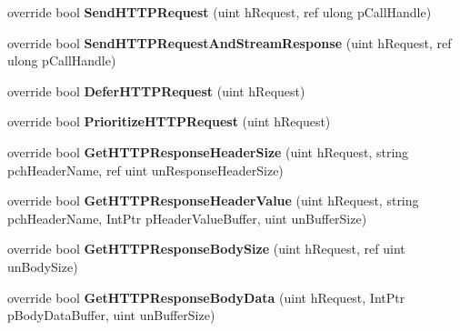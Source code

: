 \begin{DoxyCompactItemize}
\item 
\hypertarget{classValve_1_1Steamworks_1_1CSteamHTTP_a50e12fb3f3b912def8bb3e17db53b0eb}{}override bool {\bfseries Send\+H\+T\+T\+P\+Request} (uint h\+Request, ref ulong p\+Call\+Handle)\label{classValve_1_1Steamworks_1_1CSteamHTTP_a50e12fb3f3b912def8bb3e17db53b0eb}

\item 
\hypertarget{classValve_1_1Steamworks_1_1CSteamHTTP_a670a6ab2e70e5f2fa7882a75574e7c41}{}override bool {\bfseries Send\+H\+T\+T\+P\+Request\+And\+Stream\+Response} (uint h\+Request, ref ulong p\+Call\+Handle)\label{classValve_1_1Steamworks_1_1CSteamHTTP_a670a6ab2e70e5f2fa7882a75574e7c41}

\item 
\hypertarget{classValve_1_1Steamworks_1_1CSteamHTTP_a818b1c3bdb2c64bdfe1e1214a3d969ec}{}override bool {\bfseries Defer\+H\+T\+T\+P\+Request} (uint h\+Request)\label{classValve_1_1Steamworks_1_1CSteamHTTP_a818b1c3bdb2c64bdfe1e1214a3d969ec}

\item 
\hypertarget{classValve_1_1Steamworks_1_1CSteamHTTP_ae0bdad8b9352437449c41d03ff2c4b13}{}override bool {\bfseries Prioritize\+H\+T\+T\+P\+Request} (uint h\+Request)\label{classValve_1_1Steamworks_1_1CSteamHTTP_ae0bdad8b9352437449c41d03ff2c4b13}

\item 
\hypertarget{classValve_1_1Steamworks_1_1CSteamHTTP_a63ab09b6135fc2f93c75bac9447c73ee}{}override bool {\bfseries Get\+H\+T\+T\+P\+Response\+Header\+Size} (uint h\+Request, string pch\+Header\+Name, ref uint un\+Response\+Header\+Size)\label{classValve_1_1Steamworks_1_1CSteamHTTP_a63ab09b6135fc2f93c75bac9447c73ee}

\item 
\hypertarget{classValve_1_1Steamworks_1_1CSteamHTTP_ae9a11ddda840caf57d105582b2be51b8}{}override bool {\bfseries Get\+H\+T\+T\+P\+Response\+Header\+Value} (uint h\+Request, string pch\+Header\+Name, Int\+Ptr p\+Header\+Value\+Buffer, uint un\+Buffer\+Size)\label{classValve_1_1Steamworks_1_1CSteamHTTP_ae9a11ddda840caf57d105582b2be51b8}

\item 
\hypertarget{classValve_1_1Steamworks_1_1CSteamHTTP_a123672f994b6437b3e71a2e37640ba45}{}override bool {\bfseries Get\+H\+T\+T\+P\+Response\+Body\+Size} (uint h\+Request, ref uint un\+Body\+Size)\label{classValve_1_1Steamworks_1_1CSteamHTTP_a123672f994b6437b3e71a2e37640ba45}

\item 
\hypertarget{classValve_1_1Steamworks_1_1CSteamHTTP_ae7ff78cb702b1e2b5c923842d201e64b}{}override bool {\bfseries Get\+H\+T\+T\+P\+Response\+Body\+Data} (uint h\+Request, Int\+Ptr p\+Body\+Data\+Buffer, uint un\+Buffer\+Size)\label{classValve_1_1Steamworks_1_1CSteamHTTP_ae7ff78cb702b1e2b5c923842d201e64b}


\end{DoxyCompactItemize}
